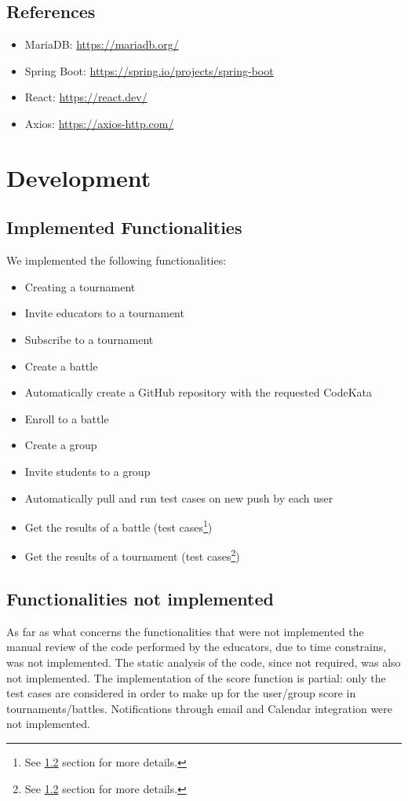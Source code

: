 \documentclass[table, 12pt]{article}
\begin{document}
\subsection{References}

\begin{itemize}
    \item MariaDB: \url{https://mariadb.org/}
    \item Spring Boot: \url{https://spring.io/projects/spring-boot}
    \item React: \url{https://react.dev/}
    \item Axios: \url{https://axios-http.com/}
\end{itemize}

\newpage
\section{Development}
\subsection{Implemented Functionalities}
We implemented the following functionalities:

\begin{itemize}
    \item Creating a tournament
    \item Invite educators to a tournament
    \item Subscribe to a tournament
    \item Create a battle
    \item Automatically create a GitHub repository with the requested CodeKata
    \item Enroll to a battle
    \item Create a group
    \item Invite students to a group
    \item Automatically pull and run test cases on new push by each user
    \item Get the results of a battle (test cases\footnote{See \ref{ssec:functionalities_not_implemented} section for more details.})
    \item Get the results of a tournament (test cases\footnote{See \ref{ssec:functionalities_not_implemented} section for more details.})
\end{itemize}

\subsection{Functionalities not implemented}\label{ssec:functionalities_not_implemented}
As far as what concerns the functionalities that were not implemented the manual review of the code performed by the educators, due to time constrains, was not implemented.
The static analysis of the code, since not required, was also not implemented. 
The implementation of the score function is partial: only the test cases are considered in order to make up for the user/group score in tournaments/battles.
Notifications through email and Calendar integration were not implemented.
\newpage
\end{document}
